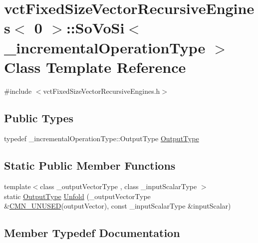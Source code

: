 \hypertarget{classvct_fixed_size_vector_recursive_engines_3_010_01_4_1_1_so_vo_si}{}\section{vct\+Fixed\+Size\+Vector\+Recursive\+Engines$<$ 0 $>$\+:\+:So\+Vo\+Si$<$ \+\_\+incremental\+Operation\+Type $>$ Class Template Reference}
\label{classvct_fixed_size_vector_recursive_engines_3_010_01_4_1_1_so_vo_si}


{\ttfamily \#include $<$vct\+Fixed\+Size\+Vector\+Recursive\+Engines.\+h$>$}

\subsection*{Public Types}
\begin{DoxyCompactItemize}
\item 
typedef \+\_\+incremental\+Operation\+Type\+::\+Output\+Type \hyperlink{classvct_fixed_size_vector_recursive_engines_3_010_01_4_1_1_so_vo_si_a1481584a05a84187a96256f328b6b587}{Output\+Type}
\end{DoxyCompactItemize}
\subsection*{Static Public Member Functions}
\begin{DoxyCompactItemize}
\item 
{\footnotesize template$<$class \+\_\+output\+Vector\+Type , class \+\_\+input\+Scalar\+Type $>$ }\\static \hyperlink{classvct_fixed_size_vector_recursive_engines_3_010_01_4_1_1_so_vo_si_a1481584a05a84187a96256f328b6b587}{Output\+Type} \hyperlink{classvct_fixed_size_vector_recursive_engines_3_010_01_4_1_1_so_vo_si_a55b43dc32c5c8ddfabc159aad3a8fb87}{Unfold} (\+\_\+output\+Vector\+Type \&\hyperlink{cmn_portability_8h_a021894e2626935fa2305434b1e893ff6}{C\+M\+N\+\_\+\+U\+N\+U\+S\+E\+D}(output\+Vector), const \+\_\+input\+Scalar\+Type \&input\+Scalar)
\end{DoxyCompactItemize}


\subsection{Member Typedef Documentation}
\hypertarget{classvct_fixed_size_vector_recursive_engines_3_010_01_4_1_1_so_vo_si_a1481584a05a84187a96256f328b6b587}{}
